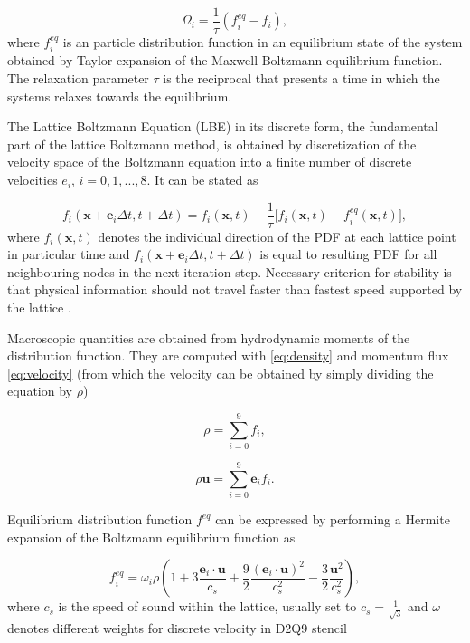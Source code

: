 \begin{equation}
	\label{eq:bgk-operator}
	\Omega_i = \frac{1}{\tau}(f^{eq}_i - f_i),
\end{equation}
where $f^{eq}_i $ is an particle distribution function in an equilibrium state of the system obtained by Taylor expansion of the Maxwell-Boltzmann equilibrium function. The relaxation parameter $\tau$ is the reciprocal that presents a time in which the systems relaxes towards the equilibrium.

The Lattice Boltzmann Equation (LBE) in its discrete form, the fundamental part of the lattice Boltzmann method, is obtained by discretization of the velocity space of the Boltzmann equation into a finite number of discrete velocities $e_i$, $i = 0,1,...,8$. It can be stated as

\begin{equation}
	\label{eq:lbe-bgk}
	f_i (\bm{x}+\bm{e}_i\Delta t,t+\Delta t) = f_i (\bm{x},t)-\frac{1}{\tau}\Big[f_i (\bm{x},t) - f_i^{eq} (\bm{x},t)\Big],
\end{equation}
where $f_i (\bm{x},t)$ denotes the individual direction of the PDF at each lattice point in particular time and $f_i (\bm{x}+\bm{e}_i\Delta t,t+\Delta t)$ is equal to resulting PDF for all neighbouring nodes in the next iteration step. Necessary criterion for stability is that physical information should not travel faster than fastest speed supported by the lattice \cite{succi2001lattice}.

Macroscopic quantities are obtained from hydrodynamic moments of the distribution function. They are computed with \ref{eq:density} and momentum flux \ref{eq:velocity} (from which the velocity can be obtained by simply dividing the equation by $\rho$)

\begin{equation}
	\label{eq:density}
	\rho = \sum_{i=0}^{9}f_i,
\end{equation}

\begin{equation}
	\label{eq:velocity}
	\rho\bm{u} = \sum_{i=0}^{9} \bm{e}_i  f_i .
\end{equation}

Equilibrium distribution function $f^{eq}$ can be expressed by performing a Hermite expansion of the Boltzmann equilibrium function as

\begin{equation}
	\label{eq:feq}
	f_i^{eq} = \omega_i \rho \left( 1+3\frac{\bm{e}_i \cdot \bm{u}}{c_s} + \frac{9}{2}\frac{(\bm{e}_i \cdot \bm{u})^2}{c_s^2}-\frac{3}{2}\frac{\bm{u}^2}{c_s^2}\right),
\end{equation}
where $c_s$ is the speed of sound within the lattice, usually set to $c_s = \frac{1}{\sqrt{3}}$ and $\omega$ denotes different weights for discrete velocity in D2Q9 stencil

